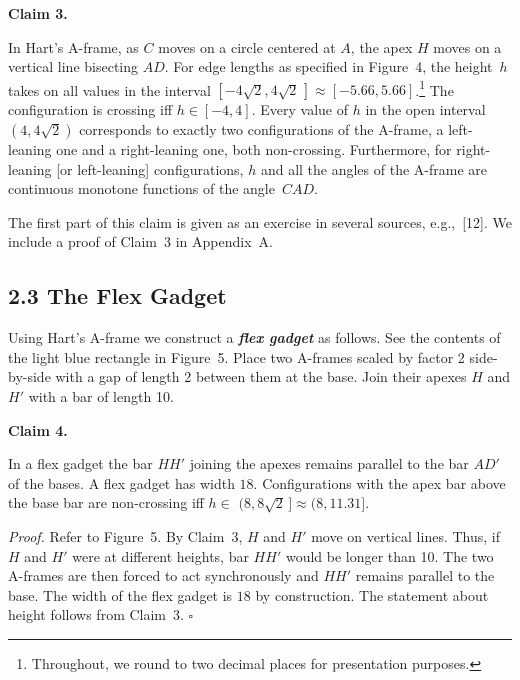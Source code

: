 \documentclass{article}
\newcommand{\defn}[1]{\textit{\textbf{\boldmath #1}}}
\begin{document}
\par\medskip\noindent\textbf{Claim 3.} \begin{itshape}

In Hart's A-frame, 
as $C$ moves on a circle centered at $A$, the apex $H$ moves on a vertical line bisecting $AD$. For edge lengths as specified in Figure~4, 
the height~$h$ 
takes on all values in the interval 
$[-4\sqrt{2}, 4\sqrt{2} \,] \approx [-5.66, 5.66]$.\footnote{Throughout, we round to two decimal places for presentation purposes.}
The configuration 
is crossing iff $h \in [-4,4]$.
Every value of $h$ in the open interval 
$(4,4\sqrt{2})$
corresponds to exactly two configurations of the A-frame, a left-leaning one and a right-leaning one, both non-crossing.
Furthermore, for right-leaning [or left-leaning] configurations, $h$ and all the angles of the A-frame are  continuous monotone functions of the angle~$CAD$.
\end{itshape}\par\medskip

The first part of this claim is given as an exercise in several sources, e.g.,~[12].  We include a proof of Claim~3 in  Appendix~A.

\subsection*{2.3 The Flex Gadget}

Using Hart's A-frame we 
construct a \defn{flex gadget} as follows.  See the contents of the light blue rectangle in Figure~5. 
Place two A-frames scaled by factor 2 side-by-side with a gap of length 2 between them at the base. Join their apexes $H$ and $H'$ with a bar of length 10. 

\par\medskip\noindent\textbf{Claim 4.} \begin{itshape}

In a flex gadget the bar $HH'$ joining the apexes remains parallel to the bar $AD'$ of the bases.
A flex gadget has width $18$.
Configurations with the apex bar above the base bar are non-crossing iff $h \in $ 
$(8, 8 \sqrt{2}\, ] \approx (8,11.31]$.
\end{itshape}\par\medskip
\par\noindent\textit{Proof.} 
Refer to Figure~5.
By Claim~3, $H$ and $H'$ move on vertical lines.  Thus,
if $H$ and $H'$ were at different heights, bar $HH'$ would be longer than 10.  The two A-frames are then forced to act synchronously and $HH'$ remains parallel to the base.
The width of the flex gadget is $18$ by construction. 
The statement about height follows from Claim~3.
\hfill$\square$\par\medskip
\end{document}
